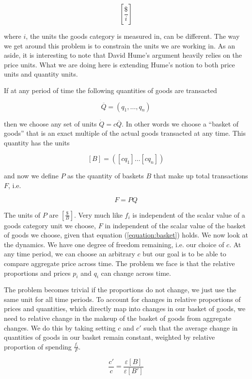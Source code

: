 \[
    \left[ \frac {\$} {i} \right]  
\]

where $i$, the units the goods category is measured in, can be different. The way we get around this
problem is to constrain the units we are working in. As an aside, it is interesting to note that
David Hume's argument heavily relies on the price units.  What we are doing here is extending Hume's
notion to both price units and quantity units. 

If at any period of time the following quantities of goods are transacted

\[
    \overline Q = \left( q_1, \dots ,q_n \right)
\]

then we choose any set of units $ \dot Q = c \overline Q $. In other words we choose a ``basket of
goods'' that is an exact multiple of the actual goods transacted at any time. This quantity has the
units

\begin{equation}\label{equation:basket}
    \left[ B \right] = \left( \left[ c q_1 \right] \dots \left[ c q_n \right] \right)
\end{equation}

and now we define $P$ as the quantity of baskets $B$ that make up total transactions $F$, i.e.  

\[
    F = P Q
\]

The units of $P$ are $\left[ \frac {\$} B \right]$. Very much like $f_i$ is independent of the
scalar value of a goods category unit we choose, $F$ in independent of the scalar value of the
basket of goods we choose, given that equation (\ref{equation:basket}) holds. We now look at the
dynamics. We have one degree of freedom remaining, i.e. our choice of $c$. At any time period, we
can choose an arbitrary $c$ but our goal is to be able to compare aggregate price across time. The
problem we face is that the relative proportions and prices $p_i$ and $q_i$ can change across time.

The problem becomes trivial if the proportions do not change, we just use the same unit for all time
periods. To account for changes in relative proportions of prices and quantities, which directly map
into changes in our basket of goods, we need to relative change in the makeup of the basket of goods
from aggregate changes. We do this by taking setting $c$ and $c'$ such that the average change in
quantities of goods in our basket remain constant, weighted by relative proportion of spending
$ \frac {f_i} F $.

\begin{equation}
    \frac {c'} c = \frac {\varepsilon [ B ]} {\varepsilon [B']}
\end{equation}

